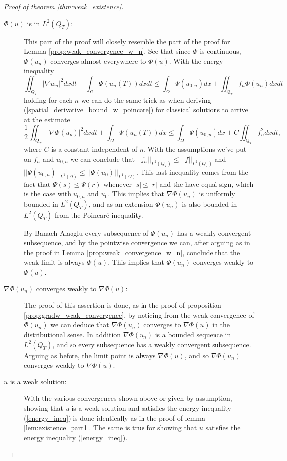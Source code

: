 \documentclass[11pt, a4paper]{article}
\begin{document}
\begin{proof}[Proof of theorem \ref{thm:weak_existence}]
\begin{description}
\item[$\Phi(u)$ is in $L^2(Q_T)$:]
This part of the proof will closely resemble the part of the proof for Lemma \ref{prop:weak_convergence_w_n}. See that since $\Phi$ is continuous, $\Phi(u_n)$ converges almost everywhere to $\Phi(u)$. With the energy inequality
\begin{equation*}
\iint_{Q_T} |\nabla w_n|^2dxdt + \int_{\Omega} \Psi(u_n(T))dxdt \leq \int_\Omega \Psi(u_{0,n})dx + \iint_{Q_T}f_n \Phi(u_n)dxdt
\end{equation*}
holding for each $n$ we can do the same trick as when deriving (\ref{spatial_derivative_bound_w_poincare}) for classical solutions to arrive at the estimate
\begin{equation}
\frac{1}{2}\iint_{Q_T}|\nabla \Phi(u_n)|^2 dxdt + \int_\Omega \Psi(u_n(T))dx \leq \int_\Omega \Psi(u_{0,n})dx + C\iint_{Q_T}f_n^2dxdt,
\end{equation}
where $C$ is a constant independent of $n$.
With the assumptions we've put on $f_n$ and $u_{0,n}$ we can conclude that $||f_n||_{L^2(Q_T)} \leq ||f||_{L^2(Q_T)}$ and $||\Psi(u_{0,n})||_{L^1(\Omega)} \leq ||\Psi(u_0)||_{L^1(\Omega)}$. This last inequality comes from the fact that $\Psi(s) \leq \Psi(r)$ whenever $|s|\leq |r|$ and the have equal sign, which is the case with $u_{0,n}$ and $u_0$. This implies that $\nabla \Phi(u_n)$ is uniformly bounded in $L^2(Q_T)$, and as an extension $\Phi(u_n)$ is also bounded in $L^2(Q_T)$ from the Poincaré inequality.

By Banach-Alaoglu every subsequence of $\Phi(u_n)$ has a weakly convergent subsequence, and by the pointwise convergence we can, after arguing as in the proof in Lemma \ref{prop:weak_convergence_w_n}, conclude that the weak limit is always $\Phi(u)$. This implies that $\Phi(u_n)$ converges weakly to $\Phi(u)$.

\item[$\nabla \Phi(u_n)$ converges weakly to $\nabla \Phi(u)$:]
The proof of this assertion is done, as in the proof of proposition \ref{prop:gradw_weak_convergence}, by noticing from the weak convergence of $\Phi(u_n)$ we can deduce that $\nabla \Phi(u_n)$ converges to $\nabla \Phi(u)$ in the distributional sense. In addition $\nabla \Phi(u_n)$ is a bounded sequence in $L^2(Q_T)$, and so every subsequence has a weakly convergent subsequence. Arguing as before, the limit point is always $\nabla \Phi(u)$, and so $\nabla \Phi(u_n)$ converges weakly to $\nabla \Phi(u)$.


\item[$u$ is a weak solution:]
With the various convergences shown above or given by assumption, showing that $u$ is a weak solution and satisfies the energy inequality (\ref{energy_ineq}) is done identically as in the proof of lemma \ref{lem:existence_part1}. The same is true for showing that $u$ satisfies the energy inequality (\ref{energy_ineq}).
\end{description}
\end{proof}
\end{document}
